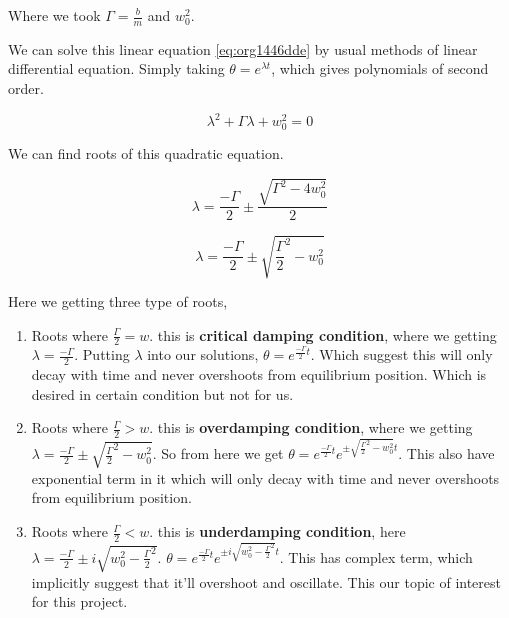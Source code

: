 \documentclass[11pt,a4paper]{article}
\begin{document}
Where we took \(\Gamma = \frac{b}{m}\) and \(w_{0}^{2}\).

We can solve this linear equation \ref{eq:org1446dde} by usual methods of linear differential equation. Simply taking \(\theta=e^{\lambda t}\), which gives polynomials of second order.

\begin{equation}
\label{eq:orgd505f63}
\lambda^{2}+\Gamma\lambda+w_{0}^{2}=0
\end{equation}

We can find roots of this quadratic equation.

\begin{equation}
\label{eq:org4a44d7f}
\lambda = \frac{-\Gamma}{2} \pm \frac{\sqrt{\Gamma^{2}-4w_{0}^{2}}}{2}
\end{equation}

\begin{equation}
\label{eq:orgb5d6a37}
\lambda = \frac{-\Gamma}{2} \pm \sqrt{\frac{\Gamma}{2}^{2}-w_{0}^{2}}
\end{equation}

Here we getting three type of roots,

\begin{enumerate}
\item Roots where \(\frac{\Gamma}{2}=w\). this is \textbf{critical damping condition}, where we getting \(\lambda=\frac{-\Gamma}{2}\). Putting \(\lambda\) into our solutions, \(\theta = e^{\frac{-\Gamma}{2}t}\). Which suggest this will only decay with time and never overshoots from equilibrium position. Which is desired in certain condition but not for us.

\item Roots where \(\frac{\Gamma}{2}>w\). this is \textbf{overdamping condition}, where we getting \(\lambda=\frac{-\Gamma}{2}\pm\sqrt{\frac{\Gamma}{2}^{2}-w_{0}^{2}}\). So from here we get \(\theta = e^{\frac{-\Gamma}{2}t}e^{\pm\sqrt{\frac{\Gamma}{2}^{2}-w_{0}^{2}}t}\). This also have exponential term in it which will only decay with time and never overshoots from equilibrium position.

\item Roots where \(\frac{\Gamma}{2}<w\). this is \textbf{underdamping condition}, here  \(\lambda=\frac{-\Gamma}{2}\pm i\sqrt{w_{0}^{2}-\frac{\Gamma}{2}^{2}}\). \(\theta = e^{\frac{-\Gamma}{2}t}e^{\pm i \sqrt{w_{0}^{2}-\frac{\Gamma}{2}^{2}}t}\). This has complex term, which implicitly suggest that it'll overshoot and oscillate. This our topic of interest for this project.
\end{enumerate}
\end{document}

